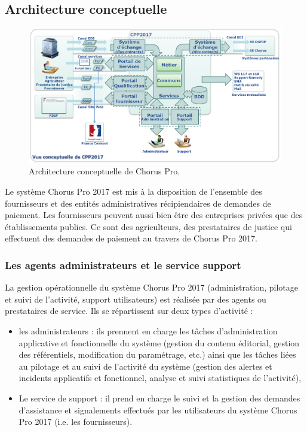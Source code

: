 \documentclass[12pt,a4paper]{article}
\begin{document}
\subsection{Architecture conceptuelle}
\begin{figure}[H]
	\begin{center}
		\includegraphics[width=\textwidth, height=\textheight, keepaspectratio]{archiConceptuelle.png}
		\caption{Architecture conceptuelle de Chorus Pro.}
	\end{center}
\end{figure}
Le système Chorus Pro 2017 est mis à la disposition de l’ensemble des fournisseurs et des entités administratives récipiendaires de demandes de paiement. Les fournisseurs peuvent aussi bien être des entreprises privées que des établissements publics. Ce sont des agriculteurs, des prestataires de justice qui effectuent des demandes de paiement au travers de Chorus Pro 2017.
\subsubsection{Les agents administrateurs et le service support}
La gestion opérationnelle du système Chorus Pro 2017 (administration, pilotage et suivi de l’activité, support utilisateurs) est réalisée par des agents ou prestataires de service. Ils se répartissent sur deux types d’activité : 
\begin{itemize}
\item les administrateurs : ils prennent en charge les tâches d’administration applicative et fonctionnelle du système (gestion du contenu éditorial, gestion des référentiels, modification du paramétrage, etc.) ainsi que les tâches liées au pilotage et au suivi de l’activité du système (gestion des alertes et incidents applicatifs et fonctionnel, analyse et suivi statistiques de l’activité),
\item Le service de support : il prend en charge le suivi et la gestion des demandes d’assistance et signalements effectués par les utilisateurs du système Chorus Pro 2017 (i.e. les fournisseurs).
\end{itemize}
\end{document}
